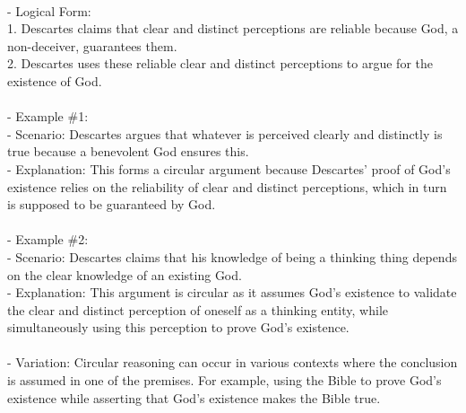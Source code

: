 \documentclass[a4paper,12pt,single,pdftex]{scrbook}
\begin{document}
    
      
    \\

    
      - Logical Form:
    \\

    
        1. Descartes claims that clear and distinct perceptions are reliable because God, a non-deceiver, guarantees them.
    \\

    
        2. Descartes uses these reliable clear and distinct perceptions to argue for the existence of God.
    \\

    
      
    \\

    
      - Example \#1:
    \\

    
        - Scenario: Descartes argues that whatever is perceived clearly and distinctly is true because a benevolent God ensures this.
    \\

    
        - Explanation: This forms a circular argument because Descartes' proof of God's existence relies on the reliability of clear and distinct perceptions, which in turn is supposed to be guaranteed by God.
    \\

    
      
    \\

    
      - Example \#2:
    \\

    
        - Scenario: Descartes claims that his knowledge of being a thinking thing depends on the clear knowledge of an existing God.
    \\

    
        - Explanation: This argument is circular as it assumes God's existence to validate the clear and distinct perception of oneself as a thinking entity, while simultaneously using this perception to prove God's existence.
    \\

    
      
    \\

    
      - Variation: Circular reasoning can occur in various contexts where the conclusion is assumed in one of the premises. For example, using the Bible to prove God's existence while asserting that God's existence makes the Bible true.
    \\
\end{document}
